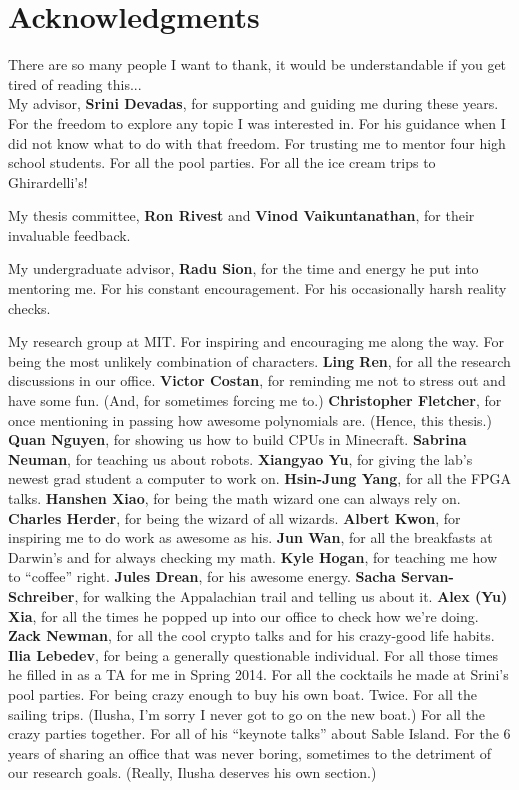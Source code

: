 \section*{Acknowledgments}

There are so many people I want to thank, it would be understandable if you get tired of reading this...\\

My advisor, \textbf{Srini Devadas}, for supporting and guiding me during these years.
For the freedom to explore any topic I was interested in.
For his guidance when I did not know what to do with that freedom.
For trusting me to mentor four high school students.
For all the pool parties.
For all the ice cream trips to Ghirardelli's!

My thesis committee, \textbf{Ron Rivest} and \textbf{Vinod Vaikuntanathan}, for their invaluable feedback.

My undergraduate advisor, \textbf{Radu Sion}, for the time and energy he put into mentoring me.
For his constant encouragement.
For his occasionally harsh reality checks.

My research group at MIT.
For inspiring and encouraging me along the way.
For being the most unlikely combination of characters.
\textbf{Ling Ren}, for all the research discussions in our office.
\textbf{Victor Costan}, for reminding me not to stress out and have some fun. (And, for sometimes forcing me to.)
\textbf{Christopher Fletcher}, for once mentioning in passing how awesome polynomials are. (Hence, this thesis.)
\textbf{Quan Nguyen}, for showing us how to build CPUs in Minecraft.
\textbf{Sabrina Neuman}, for teaching us about robots.
\textbf{Xiangyao Yu}, for giving the lab's newest grad student a computer to work on.
\textbf{Hsin-Jung Yang}, for all the FPGA talks.
\textbf{Hanshen Xiao}, for being the math wizard one can always rely on.
\textbf{Charles Herder}, for being the wizard of all wizards.
\textbf{Albert Kwon}, for inspiring me to do work as awesome as his.
\textbf{Jun Wan}, for all the breakfasts at Darwin's and for always checking my math.
\textbf{Kyle Hogan}, for teaching me how to ``coffee'' right.
\textbf{Jules Drean}, for his awesome energy.
\textbf{Sacha Servan-Schreiber}, for walking the Appalachian trail and telling us about it.
\textbf{Alex (Yu) Xia}, for all the times he popped up into our office to check how we're doing.
\textbf{Zack Newman}, for all the cool crypto talks and for his crazy-good life habits.
\textbf{Ilia Lebedev}, for being a generally questionable individual.
For all those times he filled in as a TA for me in Spring 2014.
For all the cocktails he made at Srini's pool parties.
For being crazy enough to buy his own boat. 
Twice.
For all the sailing trips.
(Ilusha, I'm sorry I never got to go on the new boat.)
For all the crazy parties together.
For all of his ``keynote talks'' about Sable Island.
For the 6 years of sharing an office that was never boring, sometimes to the detriment of our research goals.
(Really, Ilusha deserves his own section.)

